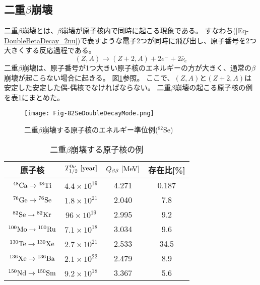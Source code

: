 \documentclass[a4paper,10pt]{jreport}
\begin{document}
\subsection{二重$\beta$崩壊}

二重$\beta$崩壊とは、$\beta$崩壊が原子核内で同時に起こる現象である。
すなわち(\ref{Eq-DoubleBetaDecay_2nu})で表すような電子2つが同時に飛び出し、原子番号を2つ大きくする反応過程である。
\begin{equation} \label{Eq-DoubleBetaDecay_2nu}
	(Z,A)\to(Z+2,A)+2e^-+2\bar{\nu}_e
\end{equation}
二重$\beta$崩壊は、原子番号が1つ大きい原子核のエネルギーの方が大きく、通常の$\beta$崩壊が起こらない場合に起きる。
図\ref{Fig-82SeDoubleDecayMode}参照。
ここで、$(Z,A)$と$(Z+2,A)$は安定した安定した偶-偶核でなければならない。
二重$\beta$崩壊の起こる原子核の例を表\ref{Tab-82SeDoubleDecayTable}にまとめた。

\begin{figure}[H]
	\center
	\texttt{[image: Fig-82SeDoubleDecayMode.png]}
	\caption{二重$\beta$崩壊する原子核のエネルギー準位例($^{82}$Se)} \label{Fig-82SeDoubleDecayMode}
\end{figure}

\begin{table}[H] 
	\center
	\caption{二重$\beta$崩壊する原子核の例\cite{Syuron_2011}} \label{Tab-82SeDoubleDecayTable}
	\begin{tabular}{cccc}
		\hline
		原子核 & $T_{1/2}^{0\nu}\ [\rm{year}]$ & $Q_{\beta\beta}\ [\rm{MeV}]$ & 存在比[\%] \\
		\hline
		$\rm{{^{48}Ca} \to {^{48}Ti}}$ & $4.4\times 10^{19}$ & 4.271 & 0.187 \\
		$\rm{{^{76}Ge} \to {^{76}Se}}$ & $1.8\times 10^{21}$ & 2.040 & 7.8 \\
		$\rm{{^{82}Se} \to {^{82}Kr}}$ & $96\times 10^{19}$ & 2.995 & 9.2 \\
		$\rm{{^{100}Mo} \to {^{100}Ru}}$ & $7.1\times 10^{18}$ & 3.034 & 9.6 \\
		$\rm{{^{130}Te} \to {^{130}Xe}}$ & $2.7\times 10^{21}$ & 2.533 & 34.5 \\
		$\rm{{^{136}Xe} \to {^{136}Ba}}$ & $2.1\times 10^{22}$ & 2.479 & 8.9 \\
		$\rm{{^{150}Nd} \to {^{150}Sm}}$ & $9.2\times 10^{18}$ & 3.367 & 5.6 \\
		\hline
	\end{tabular}
\end{table}
\end{document}
